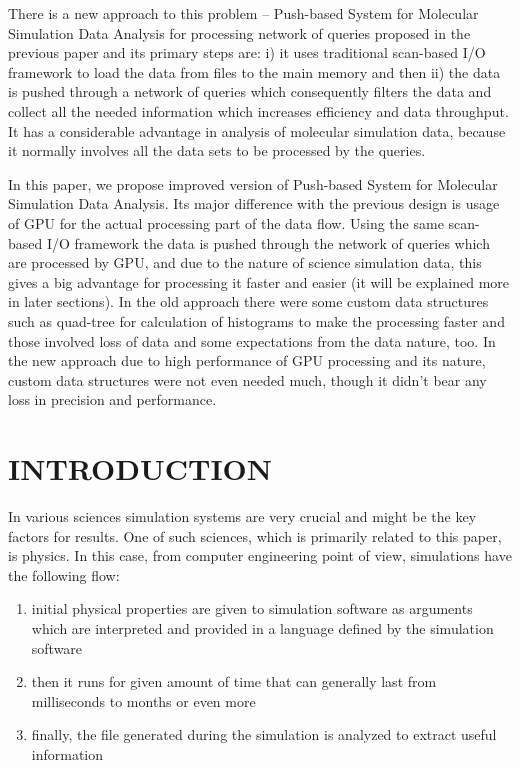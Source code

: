 \documentclass[12pt,letterpaper]{report}
\newcommand\mainmatter{%
    \cleardoublepage
  \pagenumbering{arabic}}
\begin{document}
\noindent\hspace{3em}There is a new approach to this problem -- Push-based System for Molecular Simulation Data Analysis for processing network of queries proposed in the previous paper and its primary steps are: i) it uses traditional scan-based I/O framework to load the data from files to the main memory and then ii) the data is pushed through a network of queries which consequently filters the data and collect all the needed information which increases efficiency and data throughput. It has a considerable advantage in analysis of molecular simulation data, because it normally involves all the data sets to be processed by the queries.

\noindent\hspace{3em}In this paper, we propose improved version of Push-based System for Molecular Simulation Data Analysis. Its major difference with the previous design is usage of GPU for the actual processing part of the data flow. Using the same scan-based I/O framework the data is pushed through the network of queries which are processed by GPU, and due to the nature of science simulation data, this gives a big advantage for processing it faster and easier (it will be explained more in later sections). In the old approach there were some custom data structures such as quad-tree for calculation of histograms to make the processing faster and those involved loss of data and some expectations from the data nature, too. In the new approach due to high performance of GPU processing and its nature, custom data structures were not even needed much, though it didn't bear any loss in precision and performance.

\mainmatter
\linespread{1}\selectfont
\chapter{INTRODUCTION} 
\linespread{2}\selectfont\justify
\hspace{3em} In various sciences simulation systems are very crucial and might be the key factors for results. One of such sciences, which is primarily related to this paper, is physics. In this case, from computer engineering point of view, simulations have the following flow:

\begin{enumerate}
	\item initial physical properties are given to simulation software as arguments which are interpreted and provided in a language defined by the simulation software
	\item then it runs for given amount of time that can generally last from milliseconds to months or even more
	\item finally, the file generated during the simulation is analyzed to extract useful information
\end{enumerate}
\end{document}
